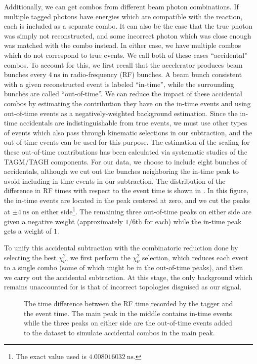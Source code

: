 Additionally, we can get combos from different beam photon combinations. If multiple tagged photons have energies which are compatible with the reaction, each is included as a separate combo. It can also be the case that the true photon was simply not reconstructed, and some incorrect photon which was close enough was matched with the combo instead. In either case, we have multiple combos which do not correspond to true events. We call both of these cases ``accidental'' combos. To account for this, we first recall that the accelerator produces beam bunches every $\SI{4}{\nano\second}$ in radio-frequency (RF) bunches. A beam bunch consistent with a given reconstructed event is labeled ``in-time'', while the surrounding bunches are called ``out-of-time''. We can reduce the impact of these accidental combos by estimating the contribution they have on the in-time events and using out-of-time events as a negatively-weighted background estimation. Since the in-time accidentals are indistinguishable from true events, we must use other types of events which also pass through kinematic selections in our subtraction, and the out-of-time events can be used for this purpose. The estimation of the scaling for these out-of-time contributions has been calculated via systematic studies of the TAGM/TAGH components. For our data, we choose to include eight bunches of accidentals, although we cut out the bunches neighboring the in-time peak to avoid including in-time events in our subtraction. The distribution of the difference in RF times with respect to the event time is shown in . In this figure, the in-time events are located in the peak centered at zero, and we cut the peaks at $\pm \SI{4}{\nano\second}$ on either side\footnote{The exact value used is $\SI{4.008016032}{\nano\second}$.}. The remaining three out-of-time peaks on either side are given a negative weight (approximately $1/6$th for each) while the in-time peak gets a weight of $1$.

To unify this accidental subtraction with the combinatoric reduction done by selecting the best $\chi^2_\nu$, we first perform the $\chi^2_\nu$ selection, which reduces each event to a single combo (some of which might be in the out-of-time peaks), and then we carry out the accidental subtraction. At this stage, the only background which remains unaccounted for is that of incorrect topologies disguised as our signal.

\begin{figure}
  \begin{center}
    
  \end{center}
  \caption{The time difference between the RF time recorded by the tagger and the event time. The main peak in the middle contains in-time events while the three peaks on either side are the out-of-time events added to the dataset to simulate accidental combos in the main peak.}\label{fig:rf-unweighted-data-pz-masscut-chisqdof-3.0-mesons}
\end{figure}
